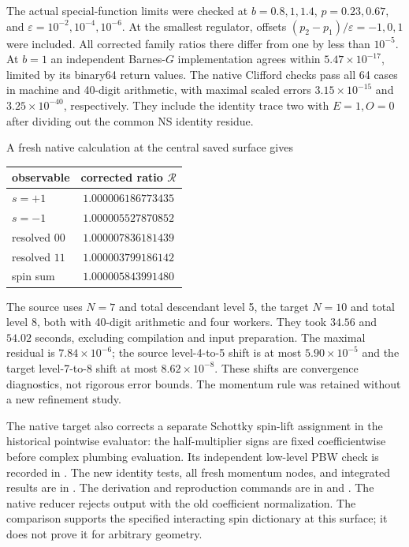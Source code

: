 The actual special-function limits were checked at $b=0.8,1,1.4$,
$p=0.23,0.67$, and $\varepsilon=10^{-2},10^{-4},10^{-6}$.
At the smallest regulator, offsets
$(p_2-p_1)/\varepsilon=-1,0,1$ were included. All corrected
family ratios there differ from one by less than $10^{-5}$.
At $b=1$ an independent Barnes-$G$ implementation agrees within
$5.47\times10^{-17}$, limited by its binary64 return values.
The native Clifford checks pass all 64 cases in machine and
40-digit arithmetic, with maximal scaled errors
$3.15\times10^{-15}$ and $3.25\times10^{-40}$, respectively.
They include the identity trace two with $E=1,O=0$ after dividing
out the common NS identity residue.

A fresh native calculation at the central saved surface gives
\begin{center}
\begin{tabular}{lc}
\toprule
observable & corrected ratio $\mathcal R$\\
\midrule
$s=+1$ & $1.000006186773435$\\
$s=-1$ & $1.000005527870852$\\
resolved $00$ & $1.000007836181439$\\
resolved $11$ & $1.000003799186142$\\
spin sum & $1.000005843991480$\\
\bottomrule
\end{tabular}
\end{center}
The source uses $N=7$ and total descendant level 5, the target
$N=10$ and total level 8, both with 40-digit arithmetic and four
workers. They took $34.56$ and $54.02$ seconds, excluding compilation
and input preparation. The maximal residual is $7.84\times10^{-6}$;
the source level-4-to-5 shift is at most $5.90\times10^{-5}$ and
the target level-7-to-8 shift at most $8.62\times10^{-8}$.
These shifts are convergence diagnostics, not rigorous error bounds.
The momentum rule was retained without a new refinement study.

The native target also corrects a separate Schottky spin-lift
assignment in the historical pointwise evaluator: the half-multiplier
signs are fixed coefficientwise before complex plumbing evaluation.
Its independent low-level PBW check is recorded in
.
The new identity tests, all fresh momentum nodes, and integrated
results are in
.
The derivation and reproduction commands are in
 and .
The native reducer rejects output with the old coefficient
normalization. The comparison supports the specified interacting
spin dictionary at this surface; it does not prove it for arbitrary
geometry.

\endgroup
